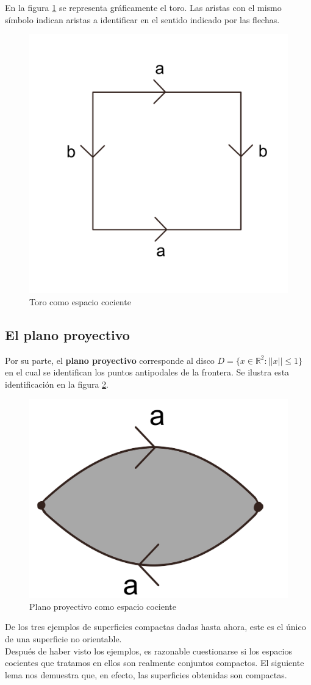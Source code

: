 \documentclass[a4paper,11pt,spanish, twoside, leqno]{tfg-uam}
\theoremstyle{definition}
\begin{document}
En la figura \ref{fig:toro expresion canonica} se representa gráficamente el toro. Las aristas con el mismo símbolo indican aristas a identificar en el sentido indicado por las flechas.

\begin{figure}[h!]
	\centering
	\includegraphics[width=0.3\linewidth]{imagenes/toroplano.png}
	\caption{Toro como espacio cociente}
	\label{fig:toro expresion canonica}
\end{figure} 


\subsection*{El plano proyectivo}
Por su parte, el \textbf{plano proyectivo} corresponde al disco $ D = \{x\in\mathbb{R}^2: ||x||\leq1 \} $ en el cual se identifican los puntos antipodales de la frontera. Se ilustra esta identificación en la figura \ref{fig:planoproyectivo expresión canónica}.

\begin{figure}[h!]
	\centering
	\includegraphics[width=0.3\linewidth]{imagenes/planop_plano.png}
	\caption{Plano proyectivo como espacio cociente}
	\label{fig:planoproyectivo expresión canónica}
\end{figure} 

De los tres ejemplos de superficies compactas dadas hasta ahora, este es el único de una superficie no orientable. 
\\

Después de haber visto los ejemplos, es razonable cuestionarse si los espacios cocientes que tratamos en ellos son realmente conjuntos compactos. El siguiente lema nos demuestra que, en efecto, las superficies obtenidas son compactas.
\end{document}
